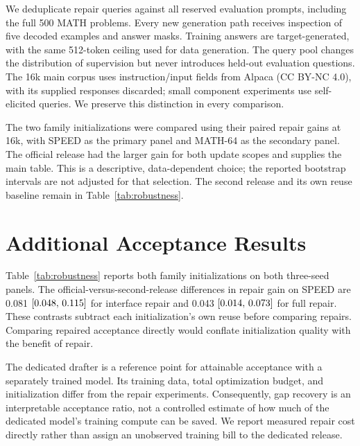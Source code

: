We deduplicate repair queries against all reserved evaluation prompts, including the full 500 MATH problems. Every new generation path receives inspection of five decoded examples and answer masks. Training answers are target-generated, with the same 512-token ceiling used for data generation. The query pool changes the distribution of supervision but never introduces held-out evaluation questions. The 16k main corpus uses instruction/input fields from Alpaca (CC BY-NC 4.0), with its supplied responses discarded; small component experiments use self-elicited queries. We preserve this distinction in every comparison.

The two family initializations were compared using their paired repair gains at 16k, with SPEED as the primary panel and MATH-64 as the secondary panel. The official release had the larger gain for both update scopes and supplies the main table. This is a descriptive, data-dependent choice; the reported bootstrap intervals are not adjusted for that selection. The second release and its own reuse baseline remain in Table~\ref{tab:robustness}.

\section{Additional Acceptance Results}
\label{app:acceptance}
\begin{table}[t]
\centering\small
\setlength{\tabcolsep}{5pt}

\caption{\textbf{Three-seed robustness on R1.} Each repair uses 16k generic queries and one epoch. Retention recovery and $\Delta\tau$ always reference the same release's reuse. The two releases are compared with paired training seeds and queries; 95\% CIs are shown. This table's MATH panel has 64 queries, unlike the seed-0 MATH-500 panel in the main table.}
\label{tab:robustness}
\end{table}

Table~\ref{tab:robustness} reports both family initializations on both three-seed panels. The official-versus-second-release differences in repair gain on SPEED are 0.081 $[0.048,\,0.115]$ for interface repair and 0.043 $[0.014,\,0.073]$ for full repair. These contrasts subtract each initialization's own reuse before comparing repairs. Comparing repaired acceptance directly would conflate initialization quality with the benefit of repair.

The dedicated drafter is a reference point for attainable acceptance with a separately trained model. Its training data, total optimization budget, and initialization differ from the repair experiments. Consequently, gap recovery is an interpretable acceptance ratio, not a controlled estimate of how much of the dedicated model's training compute can be saved. We report measured repair cost directly rather than assign an unobserved training bill to the dedicated release.

